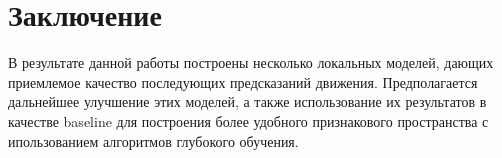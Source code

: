 \documentclass{mipt-thesis-bs}
\begin{document}


\chapter{Заключение}
В результате данной работы построены несколько локальных моделей, дающих приемлемое качество последующих предсказаний движения. Предполагается дальнейшее улучшение этих моделей, а также использование их результатов в качестве baseline для построения более удобного признакового пространства с ипользованием алгоритмов глубокого обучения.



\end{document}
